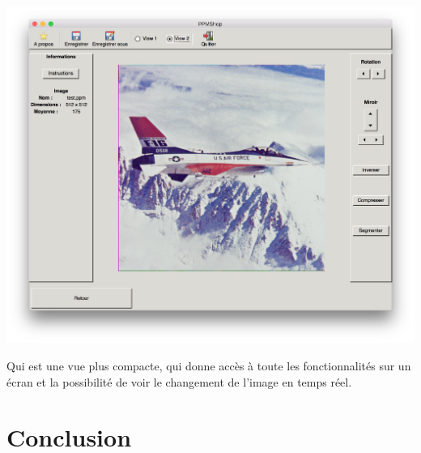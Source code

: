 \documentclass[12pt]{article}
\begin{document}
\begin{center}
\includegraphics[scale = 0.3]{view2}\\
\end{center}
Qui est une vue plus compacte, qui donne accès à toute les fonctionnalités sur un écran et la possibilité de voir le changement de l'image en temps réel. 
\section*{Conclusion}
\end{document}
